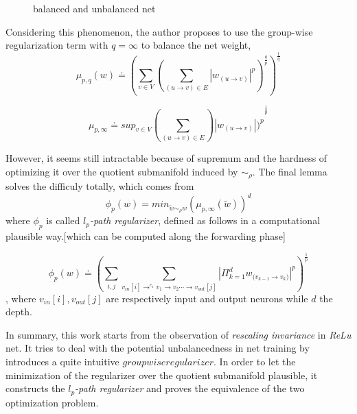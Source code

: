 \documentclass[10pt,a4paper]{article}
\begin{document}
\begin{figure}[htb]
       \caption{\label{fig:b-label} balanced and unbalanced net}
\end{figure}


Considering this phenomenon, the author proposes to use the group-wise regularization term\cite{Neyshabur201503} with $q=\infty$ to balance the net weight,
$$
	\mu_{p,q}(w) \doteq(\sum_{v\in{V}}(\sum_{(u\to{v})\in{E}}|w_{(u\to{v})}|^{p})^{\frac{q}{p}})^{\frac{1}{q}}
$$

$$
	\mu_{p,\infty}\doteq{sup_{v\in{V}}(\sum_{(u\to{v})\in{E}})|w_{(u\to{v})}|)^{p}}^{\frac{1}{p}}
$$

However, it seems still intractable because of supremum and the hardness of optimizing it over the quotient submanifold induced by $\sim_{\rho}$. The final lemma solves the difficuly totally, which comes from \cite{Neyshabur201503}
$$
	\phi_{p}(w) = min_{\tilde{w}\sim_{\rho}w}(\mu_{p,\infty}(\tilde{w}))^d
$$
where $\phi_{p}$ is called \textit{$l_p$-path regularizer}, defined as follows in a computational plausible way.[which can be computed along the forwarding phase]

$$
	\phi_{p}(w) \doteq (\sum_{i,j}\sum_{v_{in}[i]\to^{e_1}{v_1}\to{v_2}\cdots\to{v_{out}[j]}}|\Pi_{k=1}^{d}w_{(v_{k-1}\to{v_{k})}}|^{p})^{\frac{1}{p}}
$$
, where $v_{in}[i],v_{out}[j]$ are respectively input and output neurons while $d$ the depth. 
  
In summary, this work starts from the observation of \textit{rescaling invariance} in \textit{ReLu} net. It tries to deal with the potential unbalancedness in net training by introduces a quite intuitive $groupwise regularizer$. In order to let the minimization of the regularizer over the quotient submanifold plausible, it constructs the \textit{$l_p$-path regularizer} and proves the equivalence of the two optimization problem.
\end{document}
